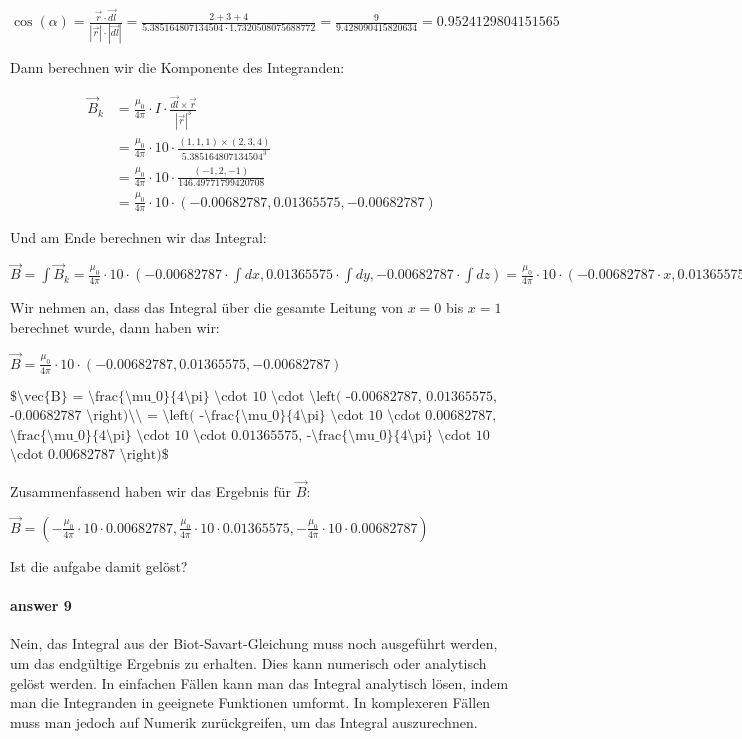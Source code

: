 \documentclass{article}
\begin{document}
$\cos(\alpha) = \frac{\vec{r} \cdot \vec{dl}}{\left| \vec{r} \right| \cdot
\left| \vec{dl} \right|} = \frac{2 + 3 + 4}{5.385164807134504 \cdot
1.7320508075688772} = \frac{9}{9.428090415820634} = 0.9524129804151565$

Dann berechnen wir die Komponente des Integranden:

\begin{align}
\vec{B}_{k} & = \frac{\mu_0}{4\pi} \cdot I \cdot \frac{\vec{dl} \times \vec{r}}{\left| \vec{r} \right|^3} \\
            & = \frac{\mu_0}{4\pi} \cdot 10 \cdot \frac{(1, 1, 1) \times (2, 3, 4)}{5.385164807134504^3} \\
            & = \frac{\mu_0}{4\pi} \cdot 10 \cdot \frac{(-1, 2, -1)}{146.49771799420708} \\
            & = \frac{\mu_0}{4\pi} \cdot 10 \cdot (-0.00682787, 0.01365575, -0.00682787)
\end{align}

Und am Ende berechnen wir das Integral:

$\vec{B} = \int \vec{B}_{k} = \frac{\mu_0}{4\pi} \cdot 10 \cdot \left(
-0.00682787 \cdot \int dx, 0.01365575 \cdot \int dy, -0.00682787 \cdot \int dz
\right) = \frac{\mu_0}{4\pi} \cdot 10 \cdot \left( -0.00682787 \cdot x,
0.01365575 \cdot y, -0.00682787 \cdot z \right)$

Wir nehmen an, dass das Integral über die gesamte Leitung von $x=0$ bis $x=1$
berechnet wurde, dann haben wir:

$\vec{B} = \frac{\mu_0}{4\pi} \cdot 10 \cdot 
\left( -0.00682787, 0.01365575, -0.00682787 \right)$

$\vec{B} = \frac{\mu_0}{4\pi} \cdot 10 \cdot \left( -0.00682787, 0.01365575, -0.00682787 \right)\\
= \left( -\frac{\mu_0}{4\pi} \cdot 10 \cdot 0.00682787, \frac{\mu_0}{4\pi}
\cdot 10 \cdot 0.01365575, -\frac{\mu_0}{4\pi} \cdot 10 \cdot 0.00682787
\right)$

Zusammenfassend haben wir das Ergebnis für $\vec{B}$:

$\vec{B} = \left( -\frac{\mu_0}{4\pi} \cdot 10 \cdot 0.00682787, \frac{\mu_0}{4\pi} \cdot 10 \cdot 0.01365575, -\frac{\mu_0}{4\pi} \cdot 10 \cdot 0.00682787 \right)$

\label{par:prompt 9}
Ist die aufgabe damit gelöst?

\paragraph{answer 9} %
\label{par:answer 9}
Nein, das Integral aus der Biot-Savart-Gleichung muss noch ausgeführt werden,
um das endgültige Ergebnis zu erhalten. Dies kann numerisch oder analytisch
gelöst werden. In einfachen Fällen kann man das Integral analytisch lösen,
indem man die Integranden in geeignete Funktionen umformt. In komplexeren
Fällen muss man jedoch auf Numerik zurückgreifen, um das Integral auszurechnen.
\end{document}
